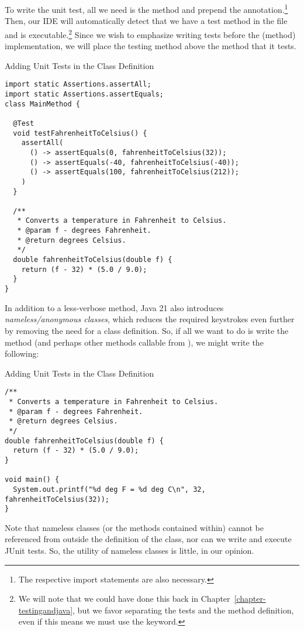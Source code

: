 To write the unit test, all we need is the  method and prepend the  annotation.\footnote{The respective import statements are also necessary.} Then, our IDE will automatically detect that we have a test method in the file and is executable.\footnote{We will note that we could have done this back in Chapter~\ref{chapter-testingandjava}, but we favor separating the tests and the method definition, even if this means we must use the  keyword.} Since we wish to emphasize writing tests before the (method) implementation, we will place the testing method above the method that it tests. 

\begin{cl}[]{Adding Unit Tests in the Class Definition}
\begin{lstlisting}[language=MyJava]
import static Assertions.assertAll;
import static Assertions.assertEquals;
class MainMethod {

  @Test
  void testFahrenheitToCelsius() {
    assertAll(
      () -> assertEquals(0, fahrenheitToCelsius(32));
      () -> assertEquals(-40, fahrenheitToCelsius(-40));
      () -> assertEquals(100, fahrenheitToCelsius(212));
    )
  }
  
  /**
   * Converts a temperature in Fahrenheit to Celsius.
   * @param f - degrees Fahrenheit.
   * @return degrees Celsius.
   */
  double fahrenheitToCelsius(double f) {
    return (f - 32) * (5.0 / 9.0); 
  }
}
\end{lstlisting}
\end{cl}

In addition to a less-verbose  method, Java 21 also introduces \emph{nameless/anonymous classes}, which reduces the required keystrokes even further by removing the need for a class definition. So, if all we want to do is write the  method (and perhaps other methods callable from ), we might write the following:

\begin{cl}[]{Adding Unit Tests in the Class Definition}
\begin{lstlisting}[language=MyJava]
/**
 * Converts a temperature in Fahrenheit to Celsius.
 * @param f - degrees Fahrenheit.
 * @return degrees Celsius.
 */
double fahrenheitToCelsius(double f) {
  return (f - 32) * (5.0 / 9.0); 
}

void main() {
  System.out.printf("%d deg F = %d deg C\n", 32, fahrenheitToCelsius(32));
}
\end{lstlisting}
\end{cl}

Note that nameless classes (or the methods contained within) cannot be referenced from outside the definition of the class, nor can we write and execute JUnit tests. So, the utility of nameless classes is little, in our opinion.